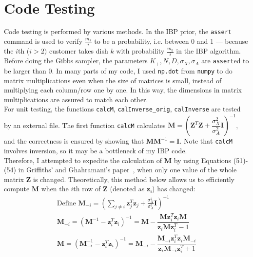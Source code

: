 \section{Code Testing}
Code testing is performed by various methods. In the IBP prior, the \texttt{assert} command is used to verify $\frac{m_k}{i}$ to be a probability, i.e. between 0 and 1 --- because the $i$th ($i > 2)$ customer takes dish $k$ with probability $\frac{m_k}{i}$ in the IBP algorithm. Before doing the Gibbs sampler, the parameters $K_+, N, D, \sigma_X, \sigma_A$ are \texttt{assert}ed to be larger than 0. In many parts of my code, I used \texttt{np.dot} from \texttt{numpy} to do matrix multiplications even when the size of matrices is small, instead of multiplying each column/row one by one. In this way, the dimensions in matrix multiplications are assured to match each other.\\

For unit testing, the functions \texttt{calcM}, \texttt{calInverse\_orig}, \texttt{calInverse} are tested by an external file. The first function \texttt{calcM} calculates $\mathbf{M} = (\mathbf{Z}^T\mathbf{Z}+\dfrac{\sigma_X^2}{\sigma_A^2}\mathbf{I})^{-1}$, and the correctness is ensured by showing that $\mathbf{M}\mathbf{M}^{-1} = \mathbf{I}$. Note that \texttt{calcM} involves inversion, so it may be a bottleneck of my IBP code.\\

Therefore, I attempted to expedite the calculation of $\mathbf{M}$ by using Equations (51)-(54) in Griffiths' and Ghahramani's paper~\cite{griffiths2005detailed}, when only one value of the whole matrix $\textbf{Z}$ is changed. Theoretically, this method below allows us to efficiently compute $\mathbf{M}$ when the $i$th row of $\mathbf{Z}$ (denoted as $\mathbf{z_i}$) has changed:
\begin{gather}
\text{Define } \mathbf{M}_{-i} = (\sum_{j \neq i}\mathbf{z}^T_j \mathbf{z}_j + \frac{\sigma_X^2}{\sigma_A^2}\mathbf{I})^{-1} \\
\mathbf{M}_{-i} = (\mathbf{M}^{-1} - \mathbf{z}^T_i \mathbf{z}_i)^{-1} 
= \mathbf{M} - \dfrac{\mathbf{M}\mathbf{z}^T_i \mathbf{z}_i\mathbf{M}}{\mathbf{z}_i\mathbf{M}\mathbf{z}^T_i - 1} \\
\mathbf{M} = (\mathbf{M}_{-i}^{-1} - \mathbf{z}^T_i \mathbf{z}_i)^{-1} 
= \mathbf{M}_{-i} - \dfrac{\mathbf{M}_{-i}\mathbf{z}^T_i \mathbf{z}_i\mathbf{M}_{-i}}{\mathbf{z}_i\mathbf{M}_{-i}\mathbf{z}^T_i + 1}
\end{gather}

